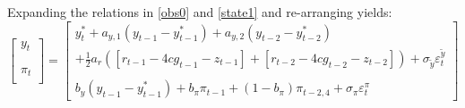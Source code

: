 \documentclass[a4paper,12pt]{article}
\begin{document}
\pagebreak

Expanding the relations in \ref{obs0} and \ref{state1} and re-arranging
yields:%
\begin{equation}
\begin{bmatrix}
y_{t} \\ 
\\ 
\\ 
\pi _{t} \\ 
\end{bmatrix}%
=%
\begin{bmatrix}
y_{t}^{\ast }+a_{y,1}\left( y_{t-1}-y_{t-1}^{\ast }\right) +a_{y,2}\left(
y_{t-2}-y_{t-2}^{\ast }\right) \\ 
+\frac{1}{2}a_{r}\left( \left[ r_{t-1}-4cg_{t-1}-z_{t-1}\right] +\left[
r_{t-2}-4cg_{t-2}-z_{t-2}\right] \right) +\sigma _{\tilde{y}}\varepsilon
_{t}^{\tilde{y}} \\ 
\\ 
b_{y}\left( y_{t-1}-y_{t-1}^{\ast }\right) +b_{\pi }\pi _{t-1}+(1-b_{\pi
})\pi _{t-2,4}+\sigma _{\pi }\varepsilon _{t}^{\pi }%
\end{bmatrix}
\label{lwa}
\end{equation}
\end{document}
